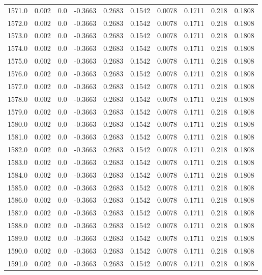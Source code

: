 \begin{longtable}{lrrrrrrrrr}
1571.0 & 0.002 & 0.0 & -0.3663 & 0.2683 & 0.1542 & 0.0078 & 0.1711 & 0.218 & 0.1808 \\
1572.0 & 0.002 & 0.0 & -0.3663 & 0.2683 & 0.1542 & 0.0078 & 0.1711 & 0.218 & 0.1808 \\
1573.0 & 0.002 & 0.0 & -0.3663 & 0.2683 & 0.1542 & 0.0078 & 0.1711 & 0.218 & 0.1808 \\
1574.0 & 0.002 & 0.0 & -0.3663 & 0.2683 & 0.1542 & 0.0078 & 0.1711 & 0.218 & 0.1808 \\
1575.0 & 0.002 & 0.0 & -0.3663 & 0.2683 & 0.1542 & 0.0078 & 0.1711 & 0.218 & 0.1808 \\
1576.0 & 0.002 & 0.0 & -0.3663 & 0.2683 & 0.1542 & 0.0078 & 0.1711 & 0.218 & 0.1808 \\
1577.0 & 0.002 & 0.0 & -0.3663 & 0.2683 & 0.1542 & 0.0078 & 0.1711 & 0.218 & 0.1808 \\
1578.0 & 0.002 & 0.0 & -0.3663 & 0.2683 & 0.1542 & 0.0078 & 0.1711 & 0.218 & 0.1808 \\
1579.0 & 0.002 & 0.0 & -0.3663 & 0.2683 & 0.1542 & 0.0078 & 0.1711 & 0.218 & 0.1808 \\
1580.0 & 0.002 & 0.0 & -0.3663 & 0.2683 & 0.1542 & 0.0078 & 0.1711 & 0.218 & 0.1808 \\
1581.0 & 0.002 & 0.0 & -0.3663 & 0.2683 & 0.1542 & 0.0078 & 0.1711 & 0.218 & 0.1808 \\
1582.0 & 0.002 & 0.0 & -0.3663 & 0.2683 & 0.1542 & 0.0078 & 0.1711 & 0.218 & 0.1808 \\
1583.0 & 0.002 & 0.0 & -0.3663 & 0.2683 & 0.1542 & 0.0078 & 0.1711 & 0.218 & 0.1808 \\
1584.0 & 0.002 & 0.0 & -0.3663 & 0.2683 & 0.1542 & 0.0078 & 0.1711 & 0.218 & 0.1808 \\
1585.0 & 0.002 & 0.0 & -0.3663 & 0.2683 & 0.1542 & 0.0078 & 0.1711 & 0.218 & 0.1808 \\
1586.0 & 0.002 & 0.0 & -0.3663 & 0.2683 & 0.1542 & 0.0078 & 0.1711 & 0.218 & 0.1808 \\
1587.0 & 0.002 & 0.0 & -0.3663 & 0.2683 & 0.1542 & 0.0078 & 0.1711 & 0.218 & 0.1808 \\
1588.0 & 0.002 & 0.0 & -0.3663 & 0.2683 & 0.1542 & 0.0078 & 0.1711 & 0.218 & 0.1808 \\
1589.0 & 0.002 & 0.0 & -0.3663 & 0.2683 & 0.1542 & 0.0078 & 0.1711 & 0.218 & 0.1808 \\
1590.0 & 0.002 & 0.0 & -0.3663 & 0.2683 & 0.1542 & 0.0078 & 0.1711 & 0.218 & 0.1808 \\
1591.0 & 0.002 & 0.0 & -0.3663 & 0.2683 & 0.1542 & 0.0078 & 0.1711 & 0.218 & 0.1808 \\

\end{longtable}
